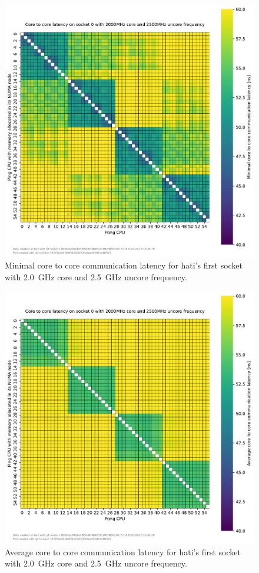 \begin{figure}[]
    \centering
    \includegraphics[width=\columnwidth]{fig/core-to-core-latency/core-to-core-heatmap-min-2000-2500.pdf}
    \caption{Minimal core to core communication latency for hati's first socket with \SI{2.0}{\GHz} core and \SI{2.5}{\GHz} uncore frequency.}
\end{figure}
\begin{figure}[]
    \centering
    \includegraphics[width=\columnwidth]{fig/core-to-core-latency/core-to-core-heatmap-avg-2000-2500.pdf}
    \caption{Average core to core communication latency for hati's first socket with \SI{2.0}{\GHz} core and \SI{2.5}{\GHz} uncore frequency.}
\end{figure}
